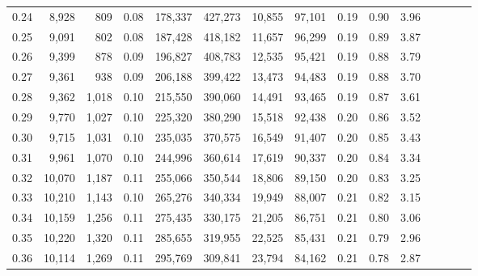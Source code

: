 \begin{tabular}{rrrcrrrrrrrrrrr}
0.24 &   8,928 &    809 &                                       0.08 &  178,337 &  427,273 &   10,855 &   97,101 &  0.19 &  0.90 &                         3.96 \\
0.25 &   9,091 &    802 &                                       0.08 &  187,428 &  418,182 &   11,657 &   96,299 &  0.19 &  0.89 &                         3.87 \\
0.26 &   9,399 &    878 &                                       0.09 &  196,827 &  408,783 &   12,535 &   95,421 &  0.19 &  0.88 &                         3.79 \\
0.27 &   9,361 &    938 &                                       0.09 &  206,188 &  399,422 &   13,473 &   94,483 &  0.19 &  0.88 &                         3.70 \\
0.28 &   9,362 &  1,018 &                                       0.10 &  215,550 &  390,060 &   14,491 &   93,465 &  0.19 &  0.87 &                         3.61 \\
0.29 &   9,770 &  1,027 &                                       0.10 &  225,320 &  380,290 &   15,518 &   92,438 &  0.20 &  0.86 &                         3.52 \\
0.30 &   9,715 &  1,031 &                                       0.10 &  235,035 &  370,575 &   16,549 &   91,407 &  0.20 &  0.85 &                         3.43 \\
0.31 &   9,961 &  1,070 &                                       0.10 &  244,996 &  360,614 &   17,619 &   90,337 &  0.20 &  0.84 &                         3.34 \\
0.32 &  10,070 &  1,187 &                                       0.11 &  255,066 &  350,544 &   18,806 &   89,150 &  0.20 &  0.83 &                         3.25 \\
0.33 &  10,210 &  1,143 &                                       0.10 &  265,276 &  340,334 &   19,949 &   88,007 &  0.21 &  0.82 &                         3.15 \\
0.34 &  10,159 &  1,256 &                                       0.11 &  275,435 &  330,175 &   21,205 &   86,751 &  0.21 &  0.80 &                         3.06 \\
0.35 &  10,220 &  1,320 &                                       0.11 &  285,655 &  319,955 &   22,525 &   85,431 &  0.21 &  0.79 &                         2.96 \\
0.36 &  10,114 &  1,269 &                                       0.11 &  295,769 &  309,841 &   23,794 &   84,162 &  0.21 &  0.78 &                         2.87 \\

\end{tabular}
